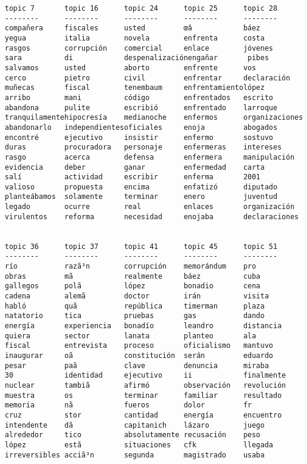 \documentclass[11pt]{article}
\begin{document}
    \begin{Verbatim}[commandchars=\\\{\}]
topic 7       topic 16      topic 24      topic 25      topic 28      
--------      --------      --------      --------      --------      
compañera     fiscales      usted         œâ            báez          
yegua         italia        novela        enfrenta      costa         
rasgos        corrupción    comercial     enlace        jóvenes       
sara          di            despenalizaciónengañar       pibes         
salvamos      usted         aborto        enfrente      vos           
cerco         pietro        civil         enfrentar     declaración   
muñecas       fiscal        tenembaum     enfrentamientolópez         
arribo        mani          código        enfrentados   escrito       
abandona      pulite        escribió      enfrentado    larroque      
tranquilamentehipocresía    medianoche    enfermos      organizaciones
abandonarlo   independientesoficiales     enoja         abogados      
encontré      ejecutivo     insistir      enfermo       sostuvo       
duras         procuradora   personaje     enfermeras    intereses     
rasgo         acerca        defensa       enfermera     manipulación  
evidencia     deber         ganar         enfermedad    carta         
salí          actividad     escribir      enferma       2001          
valioso       propuesta     encima        enfatizó      diputado      
planteábamos  solamente     terminar      enero         juventud      
legado        ocurre        real          enlaces       organización  
virulentos    reforma       necesidad     enojaba       declaraciones 


topic 36      topic 37      topic 41      topic 45      topic 51      
--------      --------      --------      --------      --------      
río           razã³n        corrupción    memorándum    pro           
obras         mã            realmente     báez          cuba          
gallegos      polã          lópez         bonadio       cena          
cadena        alemã         doctor        irán          visita        
habló         quã           república     timerman      plaza         
natatorio     tica          pruebas       gas           dando         
energía       experiencia   bonadío       leandro       distancia     
quiera        sector        lanata        planteo       ala           
fiscal        entrevista    proceso       oficialismo   mantuvo       
inaugurar     oã            constitución  serán         eduardo       
pesar         paã           clave         denuncia      miraba        
30            identidad     ejecutivo     ii            finalmente    
nuclear       tambiã        afirmó        observación   revolución    
muestra       os            terminar      familiar      resultado     
memoria       nã            fueros        dolor         fr            
cruz          stor          cantidad      energía       encuentro     
intendente    dã            capitanich    lázaro        juego         
alrededor     tico          absolutamente recusación    peso          
lópez         estã          situaciones   cfk           llegada       
irreversibles acciã³n       segunda       magistrado    usaba         



\end{Verbatim}
\end{document}
